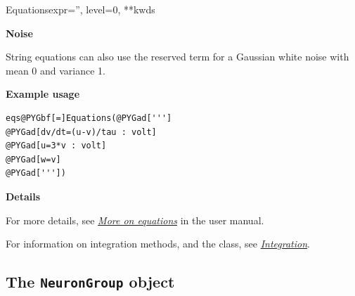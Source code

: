 \documentclass[letterpaper,10pt,english]{manual}
\begin{document}
\begin{classdesc}{Equations}{expr='', level=0, **kwds}
\begin{description}
\end{description}
\textbf{Noise}

String equations can also use the reserved term  for a
Gaussian white noise with mean 0 and variance 1.

\textbf{Example usage}

\begin{Verbatim}[commandchars=@\[\]]
eqs@PYGbf[=]Equations(@PYGad[''']
@PYGad[dv/dt=(u-v)/tau : volt]
@PYGad[u=3*v : volt]
@PYGad[w=v]
@PYGad['''])
\end{Verbatim}

\textbf{Details}

For more details, see \hyperlink{moreonequations}{\emph{More on equations}} in the user manual.
\end{classdesc}

For information on integration methods, and the 
class, see \hyperlink{integration}{\emph{Integration}}.


\subsection{The \texttt{NeuronGroup} object}
\end{document}
